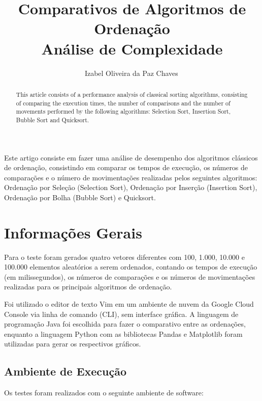 \documentclass[12pt]{article}
\title{Comparativos de Algoritmos de Ordenação\\Análise de Complexidade}
\author{Izabel Oliveira da Paz Chaves\,\orcidlink{0009-0008-9198-3909}}
\begin{document}
 

\maketitle

\begin{abstract}
  This article consists of a performance analysis of classical sorting algorithms, consisting of comparing the execution times, the number of comparisons and the number of movements performed by the following algorithms: Selection Sort, Insertion Sort, Bubble Sort and Quicksort.
\end{abstract}
     
\begin{resumo} 
  Este artigo consiste em fazer uma análise de desempenho dos algoritmos clássicos de ordenação, consistindo em comparar os tempos de execução, os números de comparações e o número de movimentações realizadas pelos seguintes algoritmos: Ordenação por Seleção (Selection Sort), Ordenação por Inserção (Insertion Sort), Ordenação por Bolha (Bubble Sort) e Quicksort.
\end{resumo}

\section{Informações Gerais}

Para o teste foram gerados quatro vetores diferentes com 100, 1.000, 10.000 e 100.000 elementos aleatórios a serem ordenados, contando os tempos de execução (em milissegundos), os números de comparações e os números de movimentações realizadas para os principais algoritmos de ordenação.

Foi utilizado o editor de texto Vim em um ambiente de nuvem da Google Cloud Console via linha de comando (CLI), sem interface gráfica. A linguagem de programação Java foi escolhida para fazer o comparativo entre as ordenações, enquanto a linguagem Python com as bibliotecas Pandas e Matplotlib foram utilizadas para gerar os respectivos gráficos.

\subsection{Ambiente de Execução}

Os testes foram realizados com o seguinte ambiente de software:
\end{document}
